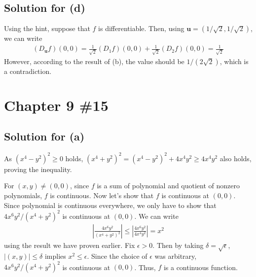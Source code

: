 \documentclass{scrartcl}
\begin{document}
\subsection{Solution for (d)}
Using the hint, suppose that \(f\) is differentiable. Then, using \(\mathbf{u}
= (1 / \sqrt{2} , 1 / \sqrt{2})\), we can write
\begin{align*}
  (D_\mathbf{u} f) (0, 0)
  = \frac{1}{\sqrt{2}} (D_1 f) (0, 0) + \frac{1}{\sqrt{2}} (D_2 f) (0, 0)
  = \frac{1}{\sqrt{2}}
\end{align*}
However, according to the result of (b), the value should be \(1 /
(2\sqrt{2})\), which is a contradiction.

\section{Chapter 9 \#15}
\subsection{Solution for (a)}
As \((x^4 - y^2)^2 \ge 0\) holds, \((x^4 + y^2)^2 = (x^4 - y^2)^2 + 4x^4 y^2
\ge 4x^4 y^2\) also holds, proving the inequality.

For \((x, y) \not = (0, 0)\), since \(f\) is a sum of polynomial and quotient
of nonzero polynomials, \(f\) is continuous. Now let's show that \(f\) is
continuous at \((0, 0)\). Since polynomial is continuous everywhere, we only
have to show that \(4x^6 y^2 / (x^4 + y^2)^2\) is continuous at \((0, 0)\). We
can write
\begin{align*}
  \left| \frac{4x^6 y^2}{(x^4 + y^2)^2} \right|
  \le \left| \frac{4x^6 y^2}{4x^4 y^2} \right|
  = x^2
\end{align*}
using the result we have proven earlier. Fix \(\epsilon > 0\). Then by taking
\(\delta = \sqrt{\epsilon}\), \(|(x, y)| \le \delta\) implies \(x^2 \le
\epsilon\). Since the choice of \(\epsilon\) was arbitrary, \(4x^6 y^2 / (x^4 +
y^2)^2\) is continuous at \((0, 0)\). Thus, \(f\) is a continuous function.
\end{document}
